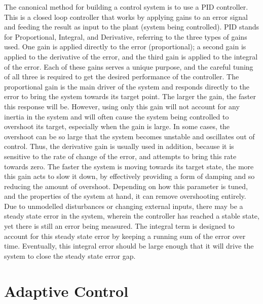 \documentclass[letterpaper,12pt,titlepage,oneside,final]{book}
\begin{document}

The canonical method for building a control system is to use a PID controller. 
This is a closed loop controller that works by applying gains to an error signal and feeding the result as input to the plant (system being controlled). 
PID stands for Proportional, Integral, and Derivative, referring to the three types of gains used. 
One gain is applied directly to the error (proportional); a second gain is applied to the derivative of the error, and the third gain is applied to the integral of the error. 
Each of these gains serves a unique purpose, and the careful tuning of all three is required to get the desired performance of the controller. 
The proportional gain is the main driver of the system and responds directly to the error to bring the system towards its target point. 
The larger the gain, the faster this response will be.
However, using only this gain will not account for any inertia in the system and will often cause the system being controlled to overshoot its target, especially when the gain is large. 
In some cases, the overshoot can be so large that the system becomes unstable and oscillates out of control.
Thus, the derivative gain is usually used in addition, because it is sensitive to the rate of change of the error, and attempts to bring this rate towards zero. 
The faster the system is moving towards its target state, the more this gain acts to slow it down, by effectively providing a form of damping and so reducing the amount of overshoot.
Depending on how this parameter is tuned, and the properties of the system at hand, it can remove overshooting entirely. 
Due to unmodelled disturbances or changing external inputs, there may be a steady state error in the system, wherein the controller has reached a stable state, yet there is still an error being measured. 
The integral term is designed to account for this steady state error by keeping a running sum of the error over time. 
Eventually, this integral error should be large enough that it will drive the system to close the steady state error gap.

\section{Adaptive Control} \label{sec:adaptive_control}
\end{document}
